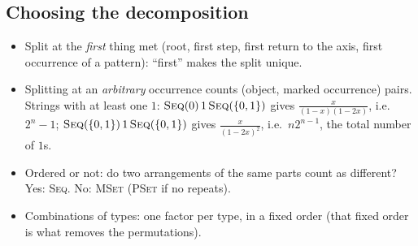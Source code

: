 	\subsection{Choosing the decomposition}
	\begin{itemize}[nosep,leftmargin=*]
	\item Split at the \emph{first} thing met (root, first step, first return to the axis, first occurrence of a pattern): ``first'' makes the split unique.
	\item Splitting at an \emph{arbitrary} occurrence counts (object, marked occurrence) pairs. Strings with at least one $1$: $\textsc{Seq}(0)\,1\,\textsc{Seq}(\{0,1\})$ gives $\frac{x}{(1-x)(1-2x)}$, i.e.\ $2^n-1$; $\textsc{Seq}(\{0,1\})\,1\,\textsc{Seq}(\{0,1\})$ gives $\frac{x}{(1-2x)^2}$, i.e.\ $n2^{n-1}$, the total number of $1$s.
	\item Ordered or not: do two arrangements of the same parts count as different? Yes: \textsc{Seq}. No: \textsc{MSet} (\textsc{PSet} if no repeats).
	\item Combinations of types: one factor per type, in a fixed order (that fixed order is what removes the permutations).
	\end{itemize}

